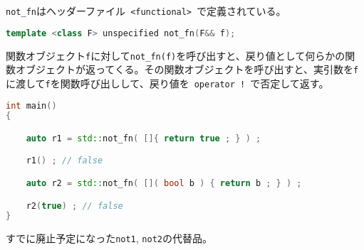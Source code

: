 %

\lstinline!not_fn!はヘッダーファイル~\lstinline!<functional>!~で定義されている。

\begin{lstlisting}[language=C++]
template <class F> unspecified not_fn(F&& f);
\end{lstlisting}

関数オブジェクト\lstinline!f!に対して\lstinline!not_fn(f)!を呼び出すと、戻り値として何らかの関数オブジェクトが返ってくる。その関数オブジェクトを呼び出すと、実引数を\lstinline!f!に渡して\lstinline!f!を関数呼び出しして、戻り値を~\lstinline"operator !"~で否定して返す。

\begin{lstlisting}[language=C++]
int main()
{

    auto r1 = std::not_fn( []{ return true ; } ) ;

    r1() ; // false

    auto r2 = std::not_fn( []( bool b ) { return b ; } ) ;

    r2(true) ; // false
}
\end{lstlisting}

すでに廃止予定になった\lstinline!not1!, \lstinline!not2!の代替品。
